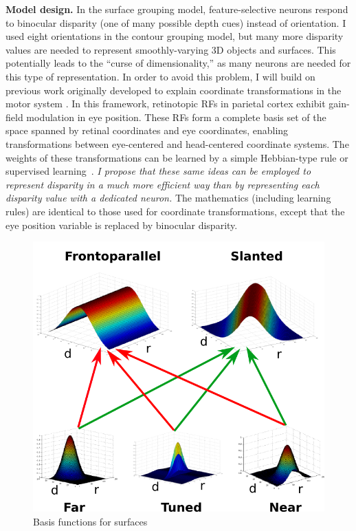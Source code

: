 \documentclass[11pt,notitlepage]{article}
\begin{document}
\textbf{Model design.} In the surface grouping model,
feature-selective neurons respond to binocular disparity (one of many
possible depth cues) instead of orientation.  I used eight
orientations in the contour grouping model, but many more disparity
values are needed to represent smoothly-varying 3D objects and
surfaces. This potentially leads to the ``curse of dimensionality,''
as many neurons are needed for this type of representation. In order
to avoid this problem, I will build on previous work originally
developed to explain coordinate transformations in the motor system
\citep{Salinas_Abbott95, Pouget_Sejnowski97b}. In this framework,
retinotopic RFs in parietal cortex exhibit gain-field modulation in
eye position. These RFs form a complete basis set of the space spanned
by retinal coordinates and eye coordinates, enabling transformations
between eye-centered and head-centered coordinate systems. The weights
of these transformations can be learned by a simple Hebbian-type rule
or supervised learning~\citep{Salinas_Abbott95}. {\em I propose that
  these same ideas can be employed to represent disparity in a much
  more efficient way than by representing each disparity value with a
  dedicated neuron.} The mathematics (including learning rules) are
identical to those used for coordinate transformations, except that
the eye position variable is replaced by binocular disparity.

\begin{figure}
  \vspace{-20pt}
  \centering 
  \includegraphics[width=.4\textwidth]{figs/basisfunc}
  \caption{Basis functions for surfaces} 
  \vspace{-15pt}
  \label{fig:BasisFunctions}
\end{figure}
\end{document}
